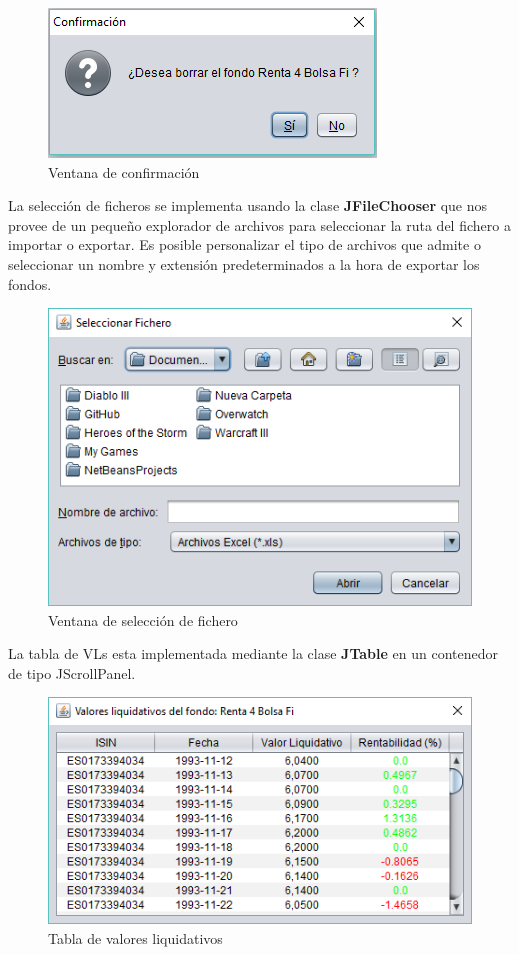 \documentclass[12pt, a4paper]{article}
\begin{document}
	\begin{figure}[htbp]
	\centering
	\includegraphics{figuras/confirmacion.PNG}
	\caption{Ventana de confirmación}
	\label{fig:confirmacion}
	\end {figure}
\newpage

La selección de ficheros se implementa usando la clase \textbf{JFileChooser} que nos provee de un pequeño explorador de archivos para seleccionar la ruta del fichero a importar o exportar. Es posible personalizar el tipo de archivos que admite o seleccionar un nombre y extensión predeterminados a la hora de exportar los fondos.

	\begin{figure}[htbp]
	\centering
	\includegraphics{figuras/fichero.PNG}
	\caption{Ventana de selección de fichero}
	\label{fig:fichero}
	\end {figure}

La tabla de \gls{VL}s esta implementada mediante la clase \textbf{JTable} en un contenedor de tipo JScrollPanel.

	\begin{figure}[htbp]
	\centering
	\includegraphics[width=12cm]{figuras/vls.PNG}
	\caption{Tabla de valores liquidativos}
	\label{fig:vls}
	\end {figure}
	
\end{document}
